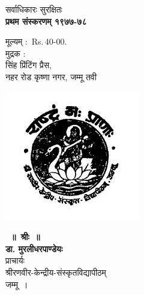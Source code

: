 \documentclass[11pt, openany]{book}
\begin{document}
\vspace{10mm}
सर्वाधिकारः सुरक्षितः\\

\vspace{5mm}
\textbf{\Large प्रथम संस्करणम् १९७७-७८\\}

\vspace{1.5cm}
{\large मूल्यम् :\textendash\  Rs.\,40-00. }\\

{\doublespacing\vspace{1cm}
मुद्रक :\textemdash \\
\indent सिंह प्रिंटिंग प्रैस,\\
\indent नहर रोड कृष्णा नगर, जम्मू तवी}
\thispagestyle{empty}
\newpage
\begin{minipage}{0.3\textwidth}
\begin{flushleft}
\includegraphics[scale=0.6]{graphics/Capture.PNG}
\end{flushleft}
\end{minipage}
\begin{minipage}{0.6\textwidth}
\begin{center}
\textbf{\LARGE~॥~श्रीः~॥}\\
\vspace{5mm}
\textbf{\LARGE डा. मुरलीधरपाण्डेयः\\}
\vspace{3mm}
{\large प्राचार्यः\\}
\vspace{3mm}
श्रीरणवीर-केन्द्रीय-संस्कृतविद्यापीठम्\\
\vspace{1mm}
जम्मू~।\\
\vspace{10mm}
\end{center}
\end{minipage}
\end{document}
